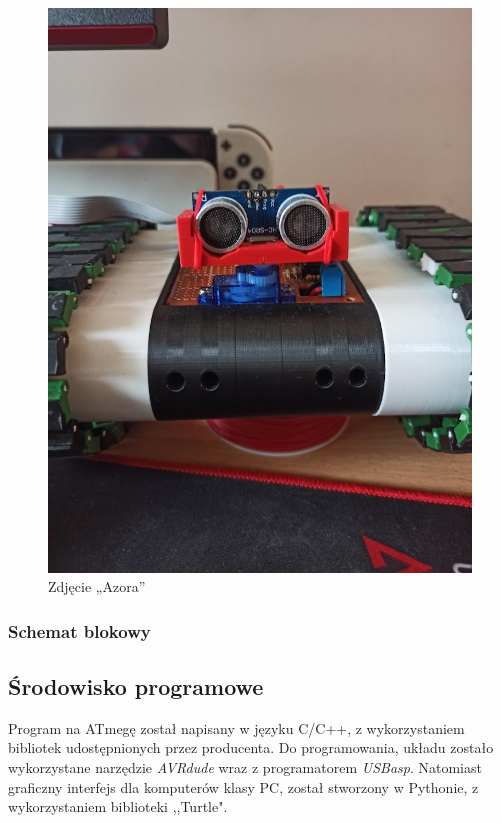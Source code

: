     \begin{figure}[!ht]
        \centering
        \includegraphics[height = 0.35\textheight]{Img/Azor.jpg}
        \caption{Zdjęcie „Azora”}
    \end{figure}

    \newpage
        \subsubsection{Schemat blokowy}
            
        
    \subsection{Środowisko programowe}
        \tab Program na ATmegę został napisany w języku C/C++, z wykorzystaniem bibliotek udostępnionych przez producenta.
        Do programowania, układu zostało wykorzystane narzędzie \textit{AVRdude} wraz z programatorem \textit{USBasp}.
        Natomiast graficzny interfejs dla komputerów klasy PC, został stworzony w Pythonie, z wykorzystaniem biblioteki ,,Turtle".
